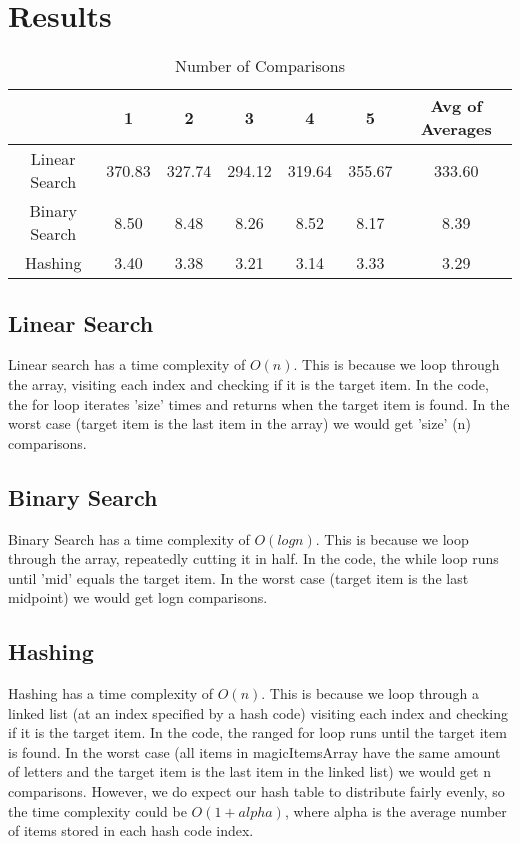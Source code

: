 \documentclass[letterpaper, 10pt,DIV=13]{scrartcl}
\numberwithin{equation}{section} %
\numberwithin{figure}{section} %
\numberwithin{table}{section} %
\begin{document}

\pagebreak


\section{Results}

\begin{table}[H]
\centering
\caption{Number of Comparisons}
\begin{tabular}{|c|c|c|c|c|c|c|}
\hline
 & 1 & 2 & 3 & 4 & 5 & Avg of Averages \\
\hline
Linear Search & 370.83 & 327.74 & 294.12 & 319.64 & 355.67 & 333.60 \\
\hline
Binary Search & 8.50 & 8.48 & 8.26 & 8.52 & 8.17 & 8.39 \\
\hline
Hashing & 3.40 & 3.38 & 3.21 & 3.14 & 3.33 & 3.29 \\
\hline
\end{tabular}
\end{table}

\subsection{Linear Search}
Linear search has a time complexity of $O(n)$. This is because we loop through the array, visiting each index and checking if it is the target item. In the code, the for loop iterates 'size' times and returns when the target item is found. In the worst case (target item is the last item in the array) we would get 'size' (n) comparisons.
\subsection{Binary Search} 
Binary Search has a time complexity of $O(logn)$. This is because we loop through the array, repeatedly cutting it in half. In the code, the while loop runs until 'mid' equals the target item. In the worst case (target item is the last midpoint) we would get logn comparisons.
\subsection{Hashing} 
Hashing has a time complexity of $O(n)$. This is because we loop through a linked list (at an index specified by a hash code) visiting each index and checking if it is the target item. In the code, the ranged for loop runs until the target item is found. In the worst case (all items in magicItemsArray have the same amount of letters and the target item is the last item in the linked list) we would get n comparisons. However, we do expect our hash table to distribute fairly evenly, so the time complexity could be $O(1 + alpha)$, where alpha is the average number of items stored in each hash code index.

\pagebreak
\end{document}
